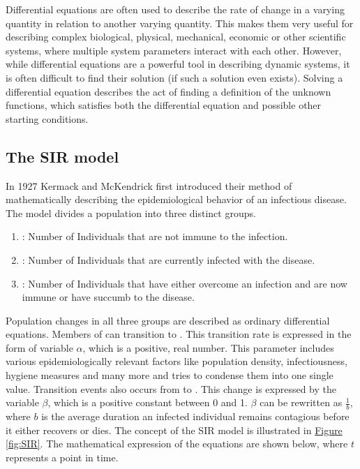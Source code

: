 Differential equations are often used to describe the rate of change in a varying quantity in relation to another
varying quantity. This makes them very useful for describing complex biological, physical, mechanical, economic
or other scientific systems, where multiple system parameters interact with each other. However, while differential
equations are a powerful tool in describing dynamic systems, it is often difficult to find their solution (if such
a solution even exists). Solving a differential equation describes the act of finding a definition of the
unknown functions, which satisfies both the differential equation and possible other starting conditions.


\subsection{The SIR model}
\label{sec:SIR}
In 1927 Kermack and McKendrick\cite{kermack1991contributions} first introduced their method of mathematically describing  
the epidemiological behavior of an infectious disease. The model divides a population into three distinct groups.

\begin{enumerate}[label=$\bullet$]
	\item {}: Number of Individuals that are not immune to the infection.
	\item {}: Number of Individuals that are currently infected with the disease.
	\item {}: Number of Individuals that  have either overcome an infection and are now immune or have succumb to the disease.
\end{enumerate}


Population changes in all three groups are described as ordinary differential equations.
Members of  can transition to . This transition rate is expressed in the
form of variable $\alpha$, which is a positive, real number. This parameter includes various epidemiologically relevant factors like
population density, infectiousness, hygiene measures and many more and tries to condense them into one single value.
Transition events also occurs from  to . This change is expressed by the variable 
$\beta$, which is a positive constant between 0 and 1. $\beta$ can be rewritten as $\frac{1}{b}$, where $b$ is the average
duration an infected individual remains contagious before it either recovers or dies. The concept of the SIR model is
illustrated in \hyperref[fig:SIR]{Figure \ref*{fig:SIR}}. The mathematical expression of the equations are shown below, where
$t$ represents a point in time.

